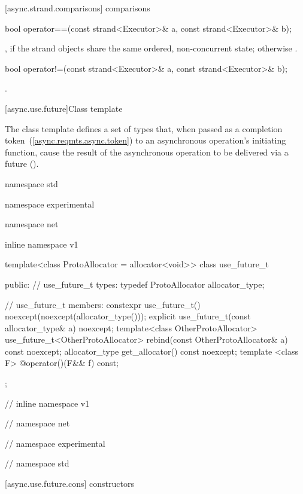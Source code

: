 [async.strand.comparisons]{ comparisons}

\begin{itemdecl}
bool operator==(const strand<Executor>& a, const strand<Executor>& b);
\end{itemdecl}

\begin{itemdescr}
\pnum
\returns {}, if the strand objects share the same ordered, non-concurrent state; otherwise .
\end{itemdescr}

\begin{itemdecl}
bool operator!=(const strand<Executor>& a, const strand<Executor>& b);
\end{itemdecl}

\begin{itemdescr}
\pnum
\returns {}.
\end{itemdescr}




[async.use.future]{Class template }

\pnum
The class template  defines a set of types that, when passed as a completion token~(\ref{async.reqmts.async.token}) to an asynchronous operation's initiating function, cause the result of the asynchronous operation to be delivered via a future ().

\begin{codeblock}
namespace std {
namespace experimental {
namespace net {
inline namespace v1 {

  template<class ProtoAllocator = allocator<void>>
  class use_future_t
  {
  public:
    // use_future_t types:
    typedef ProtoAllocator allocator_type;

    // use_future_t members:
    constexpr use_future_t() noexcept(noexcept(allocator_type()));
    explicit use_future_t(const allocator_type& a) noexcept;
    template<class OtherProtoAllocator> use_future_t<OtherProtoAllocator>
      rebind(const OtherProtoAllocator& a) const noexcept;
    allocator_type get_allocator() const noexcept;
    template <class F> @\unspec@ operator()(F&& f) const;
  };

} // inline namespace v1
} // namespace net
} // namespace experimental
} // namespace std
\end{codeblock}


[async.use.future.cons]{ constructors}

